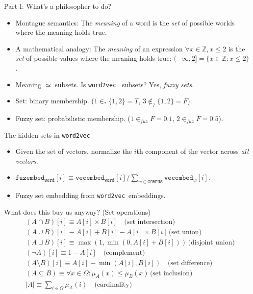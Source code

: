 \documentclass[8pt]{beamer}
\newcommand{\Z}{\mathbb Z}
\newcommand{\wtov}{\texttt{word2vec}}
\newcommand{\fuzembed}{\texttt{fuzembed}}
\newcommand{\vecembed}{\texttt{vecembed}}
\newcommand{\CORPUS}{\texttt{CORPUS}}
\newcommand{\word}{\texttt{word}}
\begin{document}
\begin{frame}{Part I: What's a philosopher to do?}
\begin{itemize}
    \item Montague semantics: The \emph{meaning} of a word is the \emph{set} of possible worlds where the meaning holds true. \pause
    \item A mathematical analogy: The \emph{meaning} of an expression $\forall x \in \Z, x \leq 2$ is the \emph{set} of possible values where the
      meaning holds true: $(-\infty, 2] = \{  x \in \Z : x \leq 2 \}$. \pause
    \item Meaning $\simeq$ subsets. Is  \wtov~ subsets?  \pause Yes, \emph{fuzzy sets}. \pause
    \item Set: binary membership. ($1 \in_? \{1, 2\} = T$, $3 \not \in_? \{1, 2\} = F$). \pause
    \item Fuzzy set: probabilistic membership. ($1 \in_{fuz} F = 0.1$, $2 \in_{fuz} F = 0.5$).
\end{itemize}
\end{frame}

\begin{frame}{The hidden sets in \texttt{word2vec}}
\begin{itemize}
  \item Given the set of vectors, normalize the $i$th component of the vector across \emph{all vectors}. \pause
  \item $\fuzembed_{\word}[i] \equiv \vecembed_{\word}[i] / \sum_{w \in \CORPUS} \vecembed_w[i]$. \pause
  \item Fuzzy set embedding from \wtov~embeddings. \pause
\end{itemize}
\end{frame}

\begin{frame}{What does this buy us anyway? (Set operations)}
\begin{align*} &(A \cap B)[i] \equiv  A[i] \times B[i] \quad \text{(set intersection)} \\
&(A \cup B)[i] \equiv  A[i] + B[i]  - A[i] \times
B[i] \, \text{(set union)}\\ &(A \sqcup B)[i] \equiv  \max(1, \min(0, A[i] +
B[i])) \, \text{(disjoint union)}\\ &(\lnot A)[i] \equiv 1 - A[i] \quad
\text{(complement)}\\ &(A \setminus B)[i] \equiv A[i]  - \min(A[i], B[i]) \quad
\text{(set difference)} \\ &(A \subseteq B) \equiv \forall x \in \Omega:
\mu_A(x) \leq \mu_B(x) \, \text{(set inclusion)}\\ &|A| \equiv \sum_{i \in \Omega} \mu_A (i) \quad \text{(cardinality)} \\
\end{align*}
\end{frame}
\end{document}
